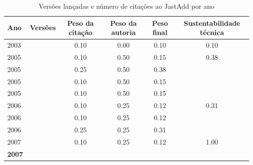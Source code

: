 \begin{table}[H]
\caption{Versões lançadas e número de citações ao JastAdd por ano}
\centering
\begin{tabular}{| l | c | c | c | c | c |}
  \hline
  Ano & Versões & Peso da citação & Peso da autoria & Peso final & Sustentabilidade técnica \\
  \hline
            2003
          &
          
          &
          0.10
          &
          0.00
          &
          0.10
          &
            {\color{red} 0.10}
          \\
\hline
            2005
          &
          
          &
          0.10
          &
          0.50
          &
          0.15
          &
            {\color{red} 0.38}
          \\
            2005
          &
          
          &
          0.25
          &
          0.50
          &
          0.38
          &
          \\
            2005
          &
          
          &
          0.10
          &
          0.50
          &
          0.15
          &
          \\
            2005
          &
          
          &
          0.10
          &
          0.50
          &
          0.15
          &
          \\
\hline
            2006
          &
          
          &
          0.10
          &
          0.25
          &
          0.12
          &
            {\color{red} 0.31}
          \\
            2006
          &
          
          &
          0.10
          &
          0.25
          &
          0.12
          &
          \\
            2006
          &
          
          &
          0.25
          &
          0.25
          &
          0.31
          &
          \\
\hline
            2007
          &
          
          &
          0.10
          &
          0.25
          &
          0.12
          &
            {\color{blue} 1.00}
          \\
            {\bf 2007}
          &
          

\end{tabular}
\end{table}
